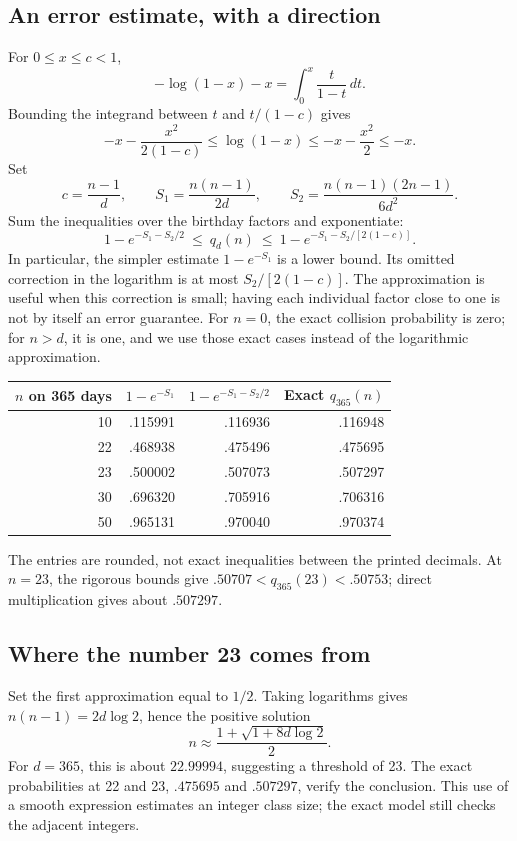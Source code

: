 \subsection*{An error estimate, with a direction}
For $0\le x\le c<1$,
\[
 -\log(1-x)-x=\int_0^x\frac{t}{1-t}\,dt.
\]
Bounding the integrand between $t$ and $t/(1-c)$ gives
\[
 -x-\frac{x^2}{2(1-c)}\le\log(1-x)
 \le-x-\frac{x^2}{2}\le-x.
\]
Set
\[
 c=\frac{n-1}{d},\qquad S_1=\frac{n(n-1)}{2d},\qquad
 S_2=\frac{n(n-1)(2n-1)}{6d^2}.
\]
Sum the inequalities over the birthday factors and exponentiate:
\[
 \boxed{\quad
 1-e^{-S_1-S_2/2}\ \le\ q_d(n)\ \le\
 1-e^{-S_1-S_2/[2(1-c)]}.
 \quad}
\]
In particular, the simpler estimate $1-e^{-S_1}$ is a lower bound.
Its omitted correction in the logarithm is at most $S_2/[2(1-c)]$.
The approximation is useful when this correction is small; having
each individual factor close to one is not by itself an error guarantee.
For $n=0$, the exact collision probability is zero; for $n>d$, it is one,
and we use those exact cases instead of the logarithmic approximation.

\begin{center}
\small
\begin{tabular}{@{}rrrr@{}}
\toprule
$n$ on 365 days & $1-e^{-S_1}$ & $1-e^{-S_1-S_2/2}$ & Exact $q_{365}(n)$\\\midrule
10&.115991&.116936&.116948\\
22&.468938&.475496&.475695\\
23&.500002&.507073&.507297\\
30&.696320&.705916&.706316\\
50&.965131&.970040&.970374\\\bottomrule
\end{tabular}
\end{center}
The entries are rounded, not exact inequalities between the printed
decimals. At $n=23$, the rigorous bounds give
$.50707<q_{365}(23)<.50753$; direct multiplication gives about $.507297$.

\subsection*{Where the number 23 comes from}
Set the first approximation equal to $1/2$. Taking logarithms gives
$n(n-1)=2d\log2$, hence the positive solution
\[
 n\approx\frac{1+\sqrt{1+8d\log2}}2.
\]
For $d=365$, this is about $22.99994$, suggesting a threshold of 23.
The exact probabilities at 22 and 23, $.475695$ and $.507297$,
verify the conclusion. This use of a smooth expression estimates an
integer class size; the exact model still checks the adjacent integers.

